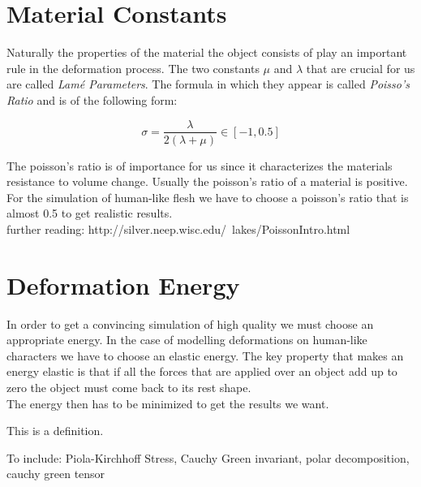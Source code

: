 


\section{Material Constants}

Naturally the properties of the material the object consists of play an important rule in the deformation process. The two constants $\mu$ and $\lambda$ that are crucial for us are called \textit{Lamé Parameters}. The formula in which they appear is called \textit{Poisso's Ratio} and is of the following form:

\[ \sigma =  \frac{\lambda}{2(\lambda + \mu)} \in [-1, 0.5] \]

The poisson's ratio is of importance for us since it characterizes the materials resistance to volume change. Usually the poisson's ratio of a material is positive.
\\
For the simulation of human-like flesh we have to choose a poisson's ratio that is almost 0.5 to get realistic results.
\\ further reading: http://silver.neep.wisc.edu/~lakes/PoissonIntro.html


\section{Deformation Energy}

In order to get a convincing simulation of high quality we must choose an appropriate energy. In the case of modelling deformations on human-like characters we have to choose an elastic energy. The key property that makes an energy elastic is that if all the forces that are applied over an object add up to zero the object must come back to its rest shape.
\\
The energy then has to be minimized to get the results we want.

\begin{definition}
  This is a definition.
\end{definition}



To include: Piola-Kirchhoff Stress, Cauchy Green invariant, polar decomposition, cauchy green tensor



